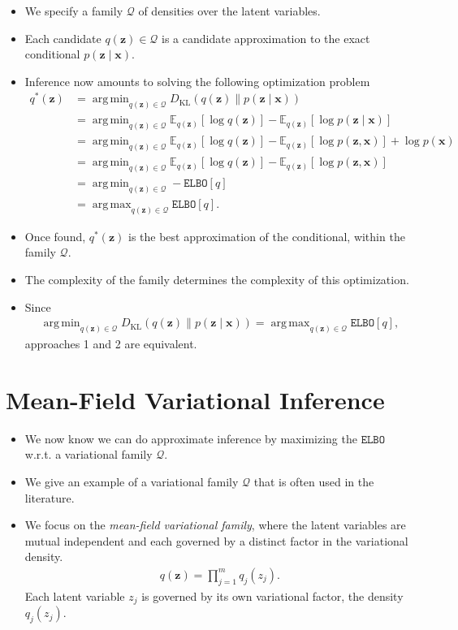 \documentclass[10pt]{article}
\newcommand{\EE}{\mathbb{E}}
\newcommand{\QQ}{\mathcal{Q}}
\newcommand{\elbo}{\texttt{ELBO}}
\newcommand{\KL}{D_{\text{KL}}}
\DeclareMathOperator*{\argmax}{arg\,max}
\DeclareMathOperator*{\argmin}{arg\,min}
\begin{document}
\begin{itemize}
\item We specify a family $\QQ$ of densities over the latent variables.
\item Each candidate $q(\bm{z}) \in \QQ$ is a candidate approximation to the exact conditional $p(\bm{z} \mid \bm{x})$.
\item Inference now amounts to solving the following optimization problem
\begin{align*}
q^*(\bm{z}) &= \argmin_{q(\bm{z}) \in \QQ} \KL(q(\bm{z}) \| p(\bm{z} \mid \bm{x})) \\
&= \argmin_{q(\bm{z}) \in \QQ} \EE_{q(\bm{z})}[ \log q(\bm{z}) ] - \EE_{q(\bm{z})}[\log p(\bm{z} \mid \bm{x})] \\
&= \argmin_{q(\bm{z}) \in \QQ} \EE_{q(\bm{z})}[ \log q(\bm{z}) ] - \EE_{q(\bm{z})}[\log p(\bm{z}, \bm{x})] + \log p(\bm{x}) \\
&= \argmin_{q(\bm{z}) \in \QQ} \EE_{q(\bm{z})}[ \log q(\bm{z}) ] - \EE_{q(\bm{z})}[\log p(\bm{z}, \bm{x})] \\
&= \argmin_{q(\bm{z}) \in \QQ} - \elbo[q] \\
&= \argmax_{q(\bm{z}) \in \QQ} \elbo[q].
\end{align*}
\item Once found, $q^*(\bm{z})$ is the best approximation of the conditional, within the family $\QQ$.
\item The complexity of the family determines the complexity of this optimization.
\item Since
\begin{align*}
\argmin_{q(\bm{z}) \in \QQ} \KL(q(\bm{z}) \| p(\bm{z} \mid \bm{x})) = \argmax_{q(\bm{z}) \in \QQ} \elbo[q],
\end{align*}
approaches 1 and 2 are equivalent.
\end{itemize}

\newpage

\section{Mean-Field Variational Inference}

\begin{itemize}
\item We now know we can do approximate inference by maximizing the $\elbo$ w.r.t. a variational family $\QQ$.
\item We give an example of a variational family $\QQ$ that is often used in the literature.
\item We focus on the \textit{mean-field variational family}, where the latent variables are mutual independent and each governed by a distinct factor in the variational density.
\begin{align} \label{eq:mf}
q(\bm{z}) = \prod_{j = 1}^m q_j(z_j).
\end{align}
Each latent variable $z_j$ is governed by its own variational factor, the density $q_j(z_j)$.
\end{itemize}
\end{document}
